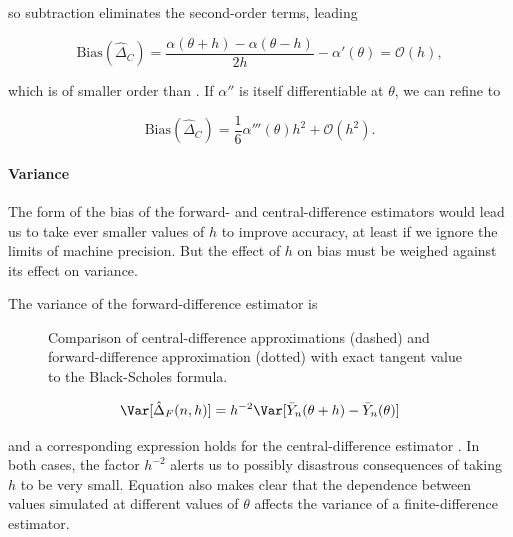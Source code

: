 so subtraction eliminates the second-order terms, leading

\begin{equation}
	\text{Bias} (\hat{\Delta}_C) = \frac{\alpha(\theta+h) - \alpha(\theta-h)}{2h} - \alpha'(\theta) = \mathcal{O}(h),
	\label{eq:CentralDiffBias}
\end{equation}

which is of smaller order than . If $\alpha''$ is itself differentiable at $\theta$, we can refine  to

\begin{equation}
	\text{Bias} (\hat{\Delta}_C) = \frac{1}{6} \alpha'''(\theta)h^2 + \mathcal{O}(h^2).
	\label{eq:CentralDiffBiasOrder}
\end{equation}

\paragraph{Variance}

The form of the bias of the forward- and central-difference estimators would lead us to take ever smaller values of $h$ to improve accuracy, at least if we ignore the limits of machine precision. But the effect of $h$ on bias must be weighed against its effect on variance.

The variance of the forward-difference estimator  is

\begin{figure}[H]
	\centering
	
	\caption{Comparison of central-difference approximations (dashed) and forward-difference approximation (dotted) with exact tangent value to the Black-Scholes formula.}
	\label{fig:finiteDifference}
\end{figure}

\begin{equation} \label{eq:VarianceOfFiniteDifferenceEstimator}
	\Var[\hat{\Delta}_F(n,h)] = h^{-2}\Var [\bar{Y}_n(\theta + h) - \bar{Y}_n(\theta)]
\end{equation}

and a corresponding expression holds for the central-difference estimator .
In both cases, the factor $h^{-2}$ alerts us to possibly disastrous consequences of
taking $h$ to be very small. Equation  also makes clear that the dependence
between values simulated at different values of $\theta$ affects the variance of a finite-difference
estimator.

